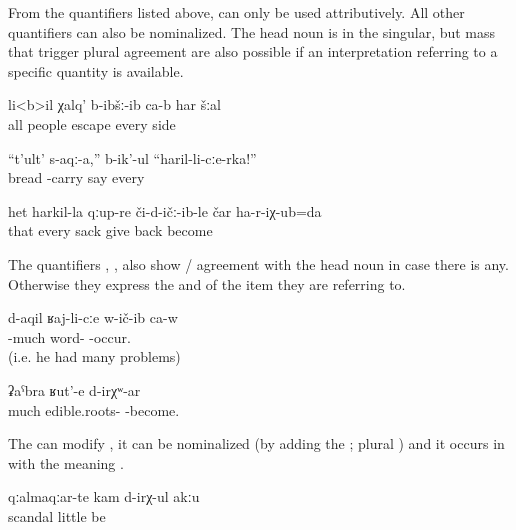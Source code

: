 From the quantifiers listed above,  can only be used attributively. All other quantifiers can also be nominalized. The head noun is in the singular, but mass  that trigger plural agreement are also possible if an interpretation referring to a specific quantity is available.
%
\begin{exe}
	\ex	\label{ex:All people escaped in every direction}
	\gll	li<b>il	χalq'	b-ibšː-ib ca-b	har	šːal\\
		all	people	escape 	every	side\\
	\glt	{}

	\ex	\label{ex:Bring bread from everyone}
	\gll	``t'ult'	s-aqː-a,''	b-ik'-ul		``haril-li-cːe-rka!''\\
		bread	-carry	say	every\\
	\glt	{}

	\ex	\label{ex:I (fem.) gave everyone's sack back and came back}
	\gll	het	harkil-la	qːup-re	či-d-ičː-ib-le						čar ha-r-iχ-ub=da\\
		that	every	sack	give	back become\\
	\glt	{}
\end{exe}

The quantifiers , ,   also show / agreement with the head noun in case there is any. Otherwise they express the  and  of the item they are referring to.
%
\begin{exe}
	\ex	\label{ex:He took part in many arguments}
	\gll	d-aqil	ʁaj-li-cːe	w-ič-ib ca-w\\
		-much	word-	-occur. \\
	\glt	{} (i.e. he had many problems)

	\ex	\label{ex:There are many edible roots}
	\gll	ʡaˁbra	ʁut'-e	d-irχʷ-ar\\
		much	edible.roots-	-become.\\
	\glt	{}
\end{exe}

The    can modify , it can be nominalized (by adding the  ; plural  ) and it occurs in  with the meaning  .
%
\begin{exe}
	\ex	\label{ex:The scandals (i.e. fights) did not diminish}
	\gll	qːalmaqːar-te	kam	d-irχ-ul	akːu\\
		scandal	little	be	\\
	\glt	{}
\end{exe}


